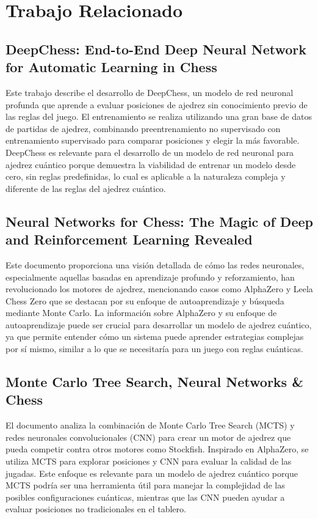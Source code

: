 \section{Trabajo Relacionado}
\subsection{DeepChess: End-to-End Deep Neural Network for Automatic Learning in Chess}
Este trabajo describe el desarrollo de DeepChess, un modelo de red neuronal profunda
que aprende a evaluar posiciones de ajedrez sin conocimiento previo de las reglas del
juego. El entrenamiento se realiza utilizando una gran base de datos de partidas de
ajedrez, combinando preentrenamiento no supervisado con entrenamiento supervisado
para comparar posiciones y elegir la más favorable. DeepChess es relevante para el
desarrollo de un modelo de red neuronal para ajedrez cuántico porque demuestra la
viabilidad de entrenar un modelo desde cero, sin reglas predefinidas, lo cual es aplicable
a la naturaleza compleja y diferente de las reglas del ajedrez cuántico.\cite{David201688}

\subsection{Neural Networks for Chess: The Magic of Deep and Reinforcement Learning Revealed}

Este documento proporciona una visión detallada de cómo las redes neuronales,
especialmente aquellas basadas en aprendizaje profundo y reforzamiento, han
revolucionado los motores de ajedrez, mencionando casos como AlphaZero y Leela Chess
Zero que se destacan por su enfoque de autoaprendizaje y búsqueda mediante Monte
Carlo. La información sobre AlphaZero y su enfoque de autoaprendizaje puede ser crucial
para desarrollar un modelo de ajedrez cuántico, ya que permite entender cómo un
sistema puede aprender estrategias complejas por sí mismo, similar a lo que se
necesitaría para un juego con reglas cuánticas.\cite{klein2021neural}

\subsection{Monte Carlo Tree Search, Neural Networks \& Chess}

El documento analiza la combinación de Monte Carlo Tree Search (MCTS) y redes
neuronales convolucionales (CNN) para crear un motor de ajedrez que pueda competir
contra otros motores como Stockfish. Inspirado en AlphaZero, se utiliza MCTS para
explorar posiciones y CNN para evaluar la calidad de las jugadas. Este enfoque es
relevante para un modelo de ajedrez cuántico porque MCTS podría ser una herramienta
útil para manejar la complejidad de las posibles configuraciones cuánticas, mientras que
las CNN pueden ayudar a evaluar posiciones no tradicionales en el tablero.\cite{steinberg2021}

